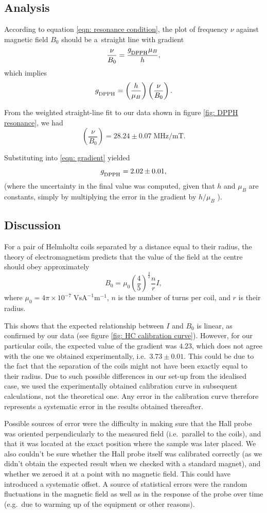 \documentclass[a4paper]{jpconf}
\numberwithin{equation}{section}
\begin{document}
\subsection{Analysis}
According to equation \eqref{eqn: resonance condition}, the plot of frequency $\nu$ against magnetic field $B_0$ should be a~straight line with gradient 
\[
	\frac{\nu}{B_0} = \frac{g_{\textsubscript{DPPH}} \mu_B}{h},
\]
which implies
\begin{equation} \label{eqn: gradient}
	g_{\textsubscript{DPPH}} = \left(\frac{h}{\mu_B}\right) \left(\frac{\nu}{B_0}\right). 
\end{equation}
	
From the weighted straight-line fit to our data shown in figure \ref{fig: DPPH resonance}, we had
\[
	\left(\frac{\nu}{B_0}\right) = 28.24 \pm 0.07 \; \si{\mega\hertz\per\milli\tesla}.
\]

Substituting into \eqref{eqn: gradient} yielded
\[
	g_{\textsubscript{DPPH}} = 2.02 \pm 0.01,
\] 
(where the uncertainty in the final value was computed, given that $h$ and $\mu_B$ are constants, simply by multiplying the error in the gradient by $h / \mu_B$ ).

\subsection{Discussion}
For a pair of Helmholtz coils separated by a distance equal to their radius, the theory of electromagnetism predicts that the value of the field at the centre should obey approximately
\[
	B_0 = \mu_0 \left(\frac45\right)^{\tfrac32} \frac{n}{r} I,
\]
where $\mu_0 = 4\pi\times10^{-7} \; \si{\volt\s\ampere\tothe{-1}\meter\tothe{-1}}$, $n$ is the number of turns per coil, and $r$ is their radius.

This shows that the expected relationship between $I$ and $B_0$ is linear, as confirmed by our data (see figure \ref{fig: HC calibration curve}).
However, for our particular coils, the expected value of the gradient was $4.23$, which does not agree with the one we obtained experimentally, i.e.\ $3.73 \pm 0.01$. This could be due to the fact that the separation of the coils might not have been exactly equal to their radius. Due to such possible differences in our set-up from the idealised case, we used the experimentally obtained calibration curve in subsequent calculations, not the theoretical one. Any error in the calibration curve therefore represents a systematic error in the results obtained thereafter.

Possible sources of error were the difficulty in making sure that the Hall probe was oriented perpendicularly to the measured field (i.e.\ parallel to the coils), and that it was located at the exact position where the sample was later placed. We also couldn't be sure whether the Hall probe itself was calibrated correctly (as we didn't obtain the expected result when we checked with a standard magnet), and whether we zeroed it at a point with no magnetic field. This could have introduced a systematic offset. A source of statistical errors were the random fluctuations in the magnetic field as well as in the response of the probe over time (e.g.\ due to warming up of the equipment or other reasons).
\end{document}
